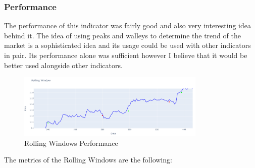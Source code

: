 \documentclass{imc-inf}
\begin{document}
	\subsubsection{Performance}
	The performance of this indicator was fairly good and also very interesting idea behind it. The idea of using peaks and walleys to determine the trend of the market
	is a sophisticated idea and its usage could be used with other indicators in pair. Its performance alone was sufficient however I believe that it would be 
	better used alongside other indicators.
	\begin{figure}[h!]
		\centering
		\includegraphics[width=0.8\textwidth]{rolling_windows_plot.png}
		\caption{Rolling Windows Performance}
		\label{fig:rolling_windows_performance}
	\end{figure}
	
	The metrics of the Rolling Windows are the following:	
	
\end{document}
